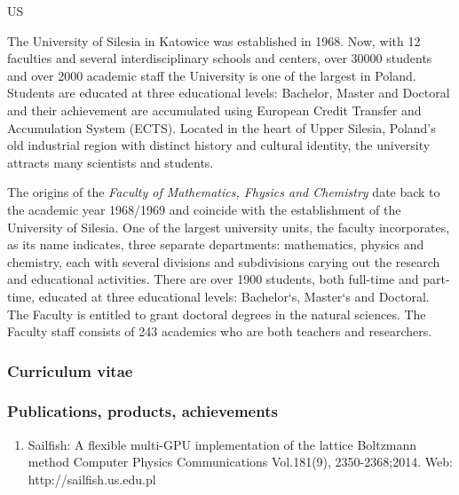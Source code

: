 \begin{sitedescription}{US}

The University of Silesia in Katowice was established in 1968. Now,
with 12 faculties and several interdisciplinary schools and centers,
over 30000 students and over 2000 academic staff the University is one
of the largest in Poland. Students are educated at three educational
levels: Bachelor, Master and Doctoral and their achievement are
accumulated using European Credit Transfer and Accumulation System
(ECTS). Located in the heart of Upper Silesia, Poland’s old industrial
region with distinct history and cultural identity, the university
attracts many scientists and students.

The origins of the {\em Faculty of Mathematics, Fhysics and Chemistry} date
back to the academic year 1968/1969 and coincide with the
establishment of the University of Silesia. One of the largest
university units, the faculty incorporates, as its name indicates,
three separate departments: mathematics, physics and chemistry, each
with several divisions and subdivisions carying out the research and
educational activities. There are over 1900 students, both full-time
and part-time, educated at three educational levels: Bachelor`s,
Master`s and Doctoral. The Faculty is entitled to grant doctoral
degrees in the natural sciences. The Faculty staff consists of 243
academics who are both teachers and researchers.

\subsubsection*{Curriculum vitae}



%
%

\subsubsection*{Publications, products, achievements}


\begin{enumerate}

\item Sailfish: A flexible multi-GPU implementation of the lattice Boltzmann method
 Computer Physics Communications Vol.181(9), 2350-2368;2014. Web: http://sailfish.us.edu.pl 


\end{enumerate}
\end{sitedescription}
